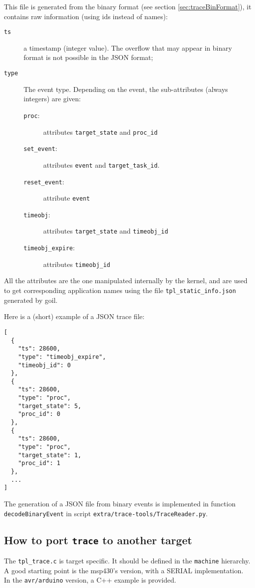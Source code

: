 This file is generated from the binary format (see section \ref{sec:traceBinFormat}), it contains raw information (using ids instead of names):

\begin{description}
	\item[\texttt{ts}] a timestamp (integer value). The overflow that may appear in binary format is not possible in the JSON format;
	\item[\texttt{type}] The event type. Depending on the event, the sub-attributes (always integers) are given:
		\begin{description}
			\item[\texttt{proc}:] attributes \texttt{target_state} and \texttt{proc_id}
			\item[\texttt{set_event}:] attributes \texttt{event} and \texttt{target_task_id}.
			\item[\texttt{reset_event}:] attribute \texttt{event}
			\item[\texttt{timeobj}:] attributes \texttt{target_state} and \texttt{timeobj_id}
			\item[\texttt{timeobj_expire}:] attributes \texttt{timeobj_id}
\end{description}
\end{description}
All the attributes are the one manipulated internally by the kernel, and are used to get corresponding application names using the file \texttt{tpl_static_info.json} generated by goil.

Here is a (short) example of a JSON trace file:
\begin{verbatim}
[
  {
    "ts": 28600,
    "type": "timeobj_expire",
    "timeobj_id": 0
  },
  {
    "ts": 28600,
    "type": "proc",
    "target_state": 5,
    "proc_id": 0
  },
  {
    "ts": 28600,
    "type": "proc",
    "target_state": 1,
    "proc_id": 1
  },
  ...
]
\end{verbatim}

The generation of a JSON file from binary events is implemented in function \texttt{decodeBinaryEvent} in script \texttt{extra/trace-tools/TraceReader.py}.

\subsection{How to port \texttt{trace} to another target}

The \texttt{tpl\_trace.c} is target specific. It should be defined in the \lstinline{machine} hierarchy. A good starting point is the msp430's version, with a SERIAL implementation. In the \texttt{avr/arduino} version, a C++ example is provided.

